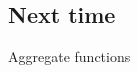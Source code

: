 \documentclass{article}
\begin{document}
 
 
 
 
 
 
 
 
  
 \subsection*{Next time}
 
 Aggregate functions  
 
 
 
 
 
 
 
 
 
 
 
 
 
 
  
   
  
  
  
  
  
  
  
  
  
  
  
  
  
  
  
  
  



 
\end{document}
